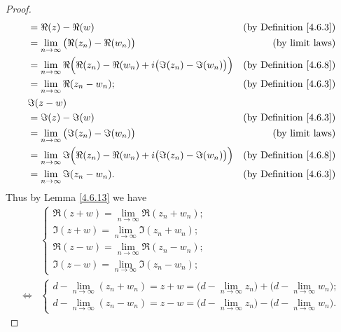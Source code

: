 \begin{proof}
\begin{align*}
         & = \Re(z) - \Re(w)                                                                        & \text{(by Definition \ref{4.6.3})} \\
         & = \lim_{n \to \infty} \big(\Re(z_n) - \Re(w_n)\big)                                      & \text{(by limit laws)}             \\
         & = \lim_{n \to \infty} \Re\Big(\Re(z_n) - \Re(w_n) + i \big(\Im(z_n) - \Im(w_n)\big)\Big) & \text{(by Definition \ref{4.6.8})} \\
         & = \lim_{n \to \infty} \Re(z_n - w_n);                                                    & \text{(by Definition \ref{4.6.3})} \\
         & \Im(z - w)                                                                                                                    \\
         & = \Im(z) - \Im(w)                                                                        & \text{(by Definition \ref{4.6.3})} \\
         & = \lim_{n \to \infty} \big(\Im(z_n) - \Im(w_n)\big)                                      & \text{(by limit laws)}             \\
         & = \lim_{n \to \infty} \Im\Big(\Re(z_n) - \Re(w_n) + i \big(\Im(z_n) - \Im(w_n)\big)\Big) & \text{(by Definition \ref{4.6.8})} \\
         & = \lim_{n \to \infty} \Im(z_n - w_n).                                                    & \text{(by Definition \ref{4.6.3})} \\
    \end{align*}
    Thus by Lemma \ref{4.6.13} we have
    \begin{align*}
             & \begin{cases}
            \Re(z + w) = \lim_{n \to \infty} \Re(z_n + w_n); \\
            \Im(z + w) = \lim_{n \to \infty} \Im(z_n + w_n); \\
            \Re(z - w) = \lim_{n \to \infty} \Re(z_n - w_n); \\
            \Im(z - w) = \lim_{n \to \infty} \Im(z_n - w_n);
        \end{cases} \\
        \iff & \begin{cases}
            d - \lim_{n \to \infty} (z_n + w_n) = z + w = \big(d - \lim_{n \to \infty} z_n\big) + \big(d - \lim_{n \to \infty} w_n\big); \\
            d - \lim_{n \to \infty} (z_n - w_n) = z - w = \big(d - \lim_{n \to \infty} z_n\big) - \big(d - \lim_{n \to \infty} w_n\big).
        \end{cases}
    \end{align*}


\end{proof}

